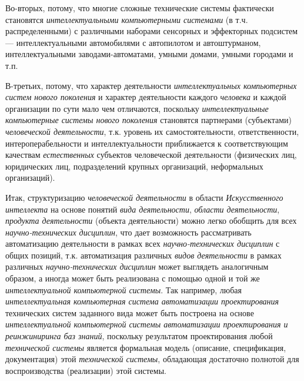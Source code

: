 \begin{textitemize}
	\item
	Во-вторых, потому, что многие сложные технические системы фактически становятся \textit{интеллектуальными компьютерными системами} (в т.ч. распределенными) с различными наборами сенсорных и эффекторных подсистем --- интеллектуальными автомобилями с автопилотом и автоштурманом, интеллектуальными заводами-автоматами, умными домами, умными городами и т.п.
	\item
	В-третьих, потому, что характер деятельности \textit{интеллектуальных компьютерных систем нового поколения} и характер деятельности каждого \textit{человека} и каждой организации по сути мало чем отличаются, поскольку \textit{интеллектуальные компьютерные системы нового поколения} становятся  партнерами (субъектами) \textit{человеческой деятельности}, т.к. уровень их самостоятельности, ответственности, интероперабельности и интеллектуальности приближается к соответствующим качествам \textit{естественных} субъектов человеческой деятельности (физических лиц, юридических лиц, подразделений крупных организаций, неформальных организаций).
\end{textitemize}

Итак, структуризацию \textit{человеческой деятельности} в области \textit{Искусственного интеллекта} на основе понятий \textit{вида деятельности}, \textit{области деятельности}, \textit{продукта деятельности} (объекта деятельности) можно легко обобщить для всех \textit{научно-технических дисциплин}, что дает возможность рассматривать автоматизацию деятельности в рамках всех \textit{научно-технических дисциплин} с общих позиций, т.к. автоматизация различных \textit{видов деятельности} в рамках различных \textit{научно-технических дисциплин} может выглядеть аналогичным образом, а иногда может быть реализована с помощью одной и той же \textit{интеллектуальной компьютерной системы}. Так например, любая \textit{интеллектуальная компьютерная система автоматизации проектирования} технических систем заданного вида может быть построена на основе \textit{интеллектуальной компьютерной системы автоматизации проектирования и реинжиниринга баз знаний}, поскольку результатом проектирования любой \textit{технической системы} является формальная модель (описание, спецификация, документация) этой \textit{технической системы}, обладающая достаточно полнотой для воспроизводства (реализации) этой системы.

